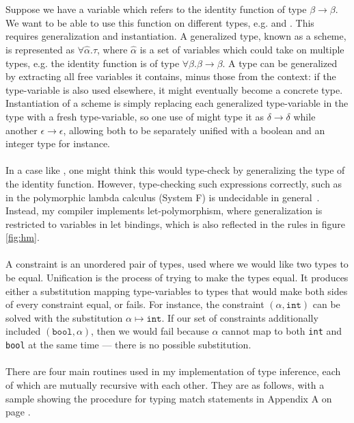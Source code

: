 \\\\
Suppose we have a variable  which refers to the identity function  of type $\beta \rightarrow \beta$. We want to be able to use this function on different types, e.g.  and . This requires generalization and instantiation. A generalized type, known as a scheme, is represented as $\forall \hat{\alpha}. \tau$, where $\hat{\alpha}$ is a set of variables which could take on multiple types, e.g. the identity function is of type $\forall \beta. \beta \rightarrow \beta$. A type can be generalized by extracting all free variables it contains, minus those from the context: if the type-variable is also used elsewhere, it might eventually become a concrete type. Instantiation of a scheme is simply replacing each generalized type-variable in the type with a fresh type-variable, so one use of  might type it as $\delta \rightarrow \delta$ while another $\epsilon \rightarrow \epsilon$, allowing both to be separately unified with a boolean and an integer type for instance.
\\\\
In a case like , one might think this would type-check by generalizing the type of the identity function. However, type-checking such expressions correctly, such as in the polymorphic lambda calculus (System F) is undecidable in general~\cite{SystemFUndecidable}. Instead, my compiler implements let-polymorphism, where generalization is restricted to variables in let bindings, which is also reflected in the rules in figure \ref{fig:hm}.
\\\\
A constraint is an unordered pair of types, used where we would like two types to be equal. Unification is the process of trying to make the types equal. It produces either a substitution mapping type-variables to types that would make both sides of every constraint equal, or fails. For instance, the constraint $(\alpha, \texttt{int})$ can be solved with the substitution $\alpha \mapsto \texttt{int}$. If our set of constraints additionally included $(\texttt{bool}, \alpha)$, then we would fail because $\alpha$ cannot map to both \texttt{int} and \texttt{bool} at the same time --- there is no possible substitution.
\\\\
There are four main routines used in my implementation of type inference, each of which are mutually recursive with each other. They are as follows, with a sample showing the procedure for typing match statements in Appendix A on page \pageref{sample:typematch}.

